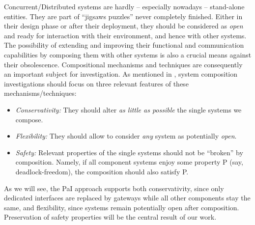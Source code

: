 Concurrent/Distributed systems are  hardly -- especially nowadays -- 
stand-alone entities. They are part of 
``jigsaws puzzles''  
never completely  finished.
Either in their design phase or after their deployment, they should be considered
as {\em open} and  ready for interaction with their environment, and hence with other systems. 
The possibility of extending and improving their functional and communication capabilities
by composing them
with other systems is also a crucial means %
against their obsolescence.
Compositional mechanisms and techniques are consequently an important subject for investigation.
As mentioned in \cite{BDGY23}, system composition investigations should focus on three relevant features
of these mechanisms/techniques:
\begin{itemize}
\item
{\em Conservativity:} 
They should alter {\em as little as possible} the single systems we compose.
\item
{\em Flexibility:} 
%
 They should allow to consider {\em any} system as potentially {\em open}.
\item
{\em Safety:}
Relevant properties of the single systems should not be ``broken'' by composition.
 Namely, if all component systems enjoy some property P (say, deadlock-freedom), the composition should also satisfy P. 
\end{itemize} 


As we will see, the PaI approach supports both conservativity, since only dedicated interfaces are replaced by gateways while all other components stay  the same,   %
and flexibility,  since systems remain potentially open after composition.
Preservation of safety properties will be the central result of our work.




